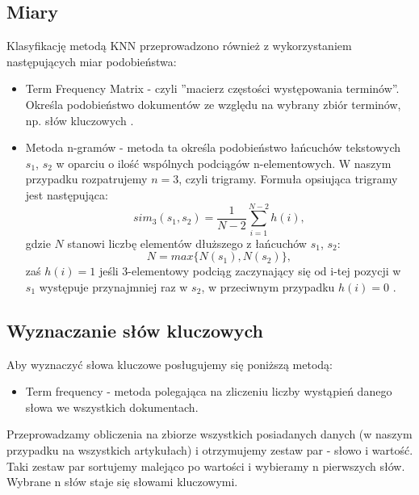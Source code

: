 \documentclass{classrep}
\begin{document}
\subsection{Miary}

Klasyfikację metodą KNN przeprowadzono również z wykorzystaniem następujących miar podobieństwa:

\begin{itemize}[label=$\bullet$\scshape\bfseries]

\item Term Frequency Matrix - czyli ”macierz częstości występowania terminów”. Określa podobieństwo dokumentów ze względu na wybrany zbiór terminów, np. słów kluczowych \cite{wyklad}.

\item Metoda n-gramów - metoda ta określa podobieństwo łańcuchów tekstowych $s_1$, $s_2$ w oparciu o ilość wspólnych podciągów n-elementowych. W naszym przypadku rozpatrujemy $n=3$, czyli trigramy. Formuła opsiująca trigramy jest następująca:
\begin{equation}
sim_{3}(s_1,s_2)= \frac{1}{N-2}\sum_{i=1}^{N-2} h(i),
\end{equation}
gdzie $N$ stanowi liczbę elementów dłuższego z łańcuchów $s_1$, $s_2$:
\begin{equation}
N=max\{N(s_1),N(s_2)\},
\end{equation}
zaś $h(i) = 1$ jeśli 3-elementowy podciąg zaczynający się od i-tej pozycji w $s_1$ występuje przynajmniej raz w $s_2$, w przeciwnym przypadku $h(i) = 0$ \cite{wyklad}.

\end{itemize}

\subsection{Wyznaczanie słów kluczowych}

Aby wyznaczyć słowa kluczowe posługujemy się poniższą metodą:

\begin{itemize}[label=$\bullet$\scshape\bfseries]
\item Term frequency - metoda polegająca na zliczeniu liczby wystąpień danego słowa we wszystkich dokumentach.
\end{itemize}

Przeprowadzamy obliczenia na zbiorze wszystkich posiadanych danych (w naszym przypadku na wszystkich artykułach) i otrzymujemy zestaw par - słowo i wartość. Taki zestaw par sortujemy malejąco po wartości i wybieramy n pierwszych słów. Wybrane n słów staje się słowami kluczowymi. \newline
\end{document}
